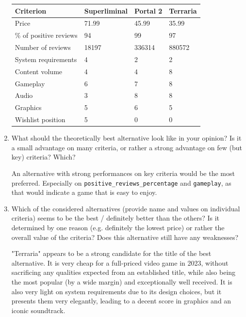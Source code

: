 \documentclass{article}
\begin{document}
\begin{enumerate}
    \begin{center}
        \begin{tabular}{ m{10em}|m{6em}|m{6em}|m{6em} }
            Criterion & Superliminal & Portal 2  & Terraria\\
            \hline
            \hline
            Price & 71.99 & 45.99 & 35.99 \\
            \% of positive reviews & 94 & 99 & 97 \\
            Number of reviews & 18197 & 336314 & 880572 \\
            System requirements & 4 & 2 & 2\\
            Content volume & 4 & 4 & 8 \\
            Gameplay & 6 & 7 & 8 \\
            Audio & 3 & 8 & 8 \\
            Graphics & 5 & 6 & 5 \\
            Wishlist position & 5 & 0 & 0 \\
        \end{tabular}
    \end{center}

    \item What should the theoretically best alternative look like in your opinion? Is it a small advantage on
    many criteria, or rather a strong advantage on few (but key) criteria? Which?

    An alternative with strong performances on key criteria would be the most preferred. Especially on \verb|positive_reviews_percentage| and \verb|gameplay|, as that would indicate a game that is easy to enjoy.

    \item Which of the considered alternatives (provide name and values on individual criteria) seems to be the
    best / definitely better than the others? Is it determined by one reason (e.g. definitely the lowest
    price) or rather the overall value of the criteria? Does this alternative still have any weaknesses?

    "Terraria" appears to be a strong candidate for the title of the best alternative.
    It is very cheap for a full-priced video game in 2023, without sacrificing any qualities expected from an established title, while also being the most popular (by a wide margin) and exceptionally well received. It is also very light on system requirements due to its design choices, but it presents them very elegantly, leading to a decent score in graphics and an iconic soundtrack.


\end{enumerate}
\end{document}
